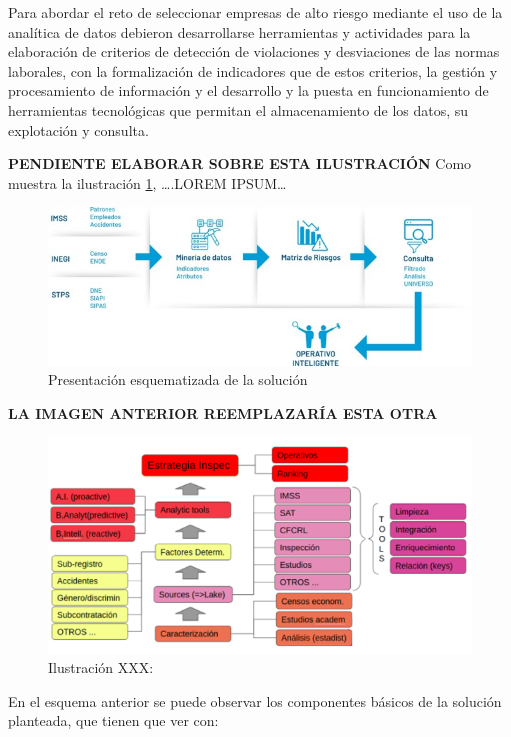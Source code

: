 \documentclass[
]{article}
\begin{document}
Para abordar el reto de seleccionar empresas de alto riesgo mediante el uso de la analítica de datos debieron desarrollarse herramientas y actividades para la elaboración de criterios de detección de violaciones y desviaciones de las normas laborales, con la formalización de indicadores que de estos criterios, la gestión y procesamiento de información y el desarrollo y la puesta en funcionamiento de herramientas tecnológicas que permitan el almacenamiento de los datos, su explotación y consulta.

\textbf{PENDIENTE ELABORAR SOBRE ESTA ILUSTRACIÓN}
Como muestra la ilustración \ref{fig:esquemaPPTSalafranca}, \ldots.LOREM IPSUM\ldots{}

\begin{figure}
\includegraphics[width=0.5\linewidth]{images-1/01/esquemaPPTSalafranca} \caption{Presentación esquematizada de la solución}\label{fig:esquemaPPTSalafranca}
\end{figure}

\textbf{LA IMAGEN ANTERIOR REEMPLAZARÍA ESTA OTRA}

\begin{figure}
\centering
\includegraphics{images-1/01/Ilustracion1.png}
\caption{Ilustración XXX:}
\end{figure}

En el esquema anterior se puede observar los componentes básicos de la solución planteada, que tienen que ver con:
\end{document}

